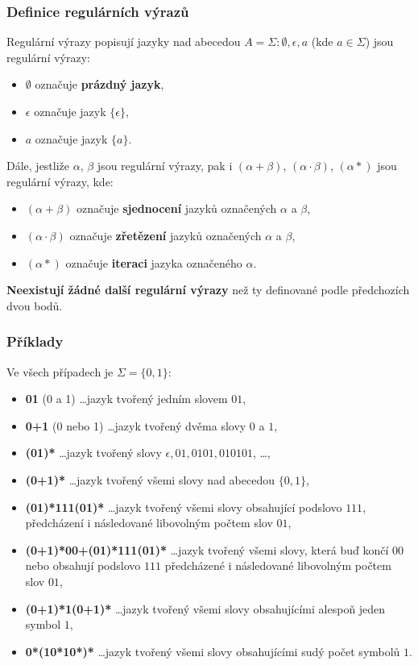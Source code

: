 \subsubsection{Definice regulárních výrazů}
Regulární výrazy popisují jazyky nad abecedou $A = \Sigma: \emptyset, \epsilon, a$ (kde $a \in \Sigma$) jsou regulární výrazy:
\begin{itemize}
	\item $\emptyset$ označuje \textbf{prázdný jazyk},
	\item $\epsilon$ označuje jazyk $\{\epsilon\}$,
	\item $a$ označuje jazyk $\{a\}$.
\end{itemize}
Dále, jestliže $\alpha$, $\beta$ jsou regulární výrazy, pak i $(\alpha + \beta)$, $(\alpha \cdot \beta)$, $(\alpha*)$ jsou regulární výrazy, kde:
\begin{itemize}
	\item $(\alpha + \beta)$ označuje \textbf{sjednocení} jazyků označených $\alpha$ a $\beta$,
	\item $(\alpha \cdot \beta)$ označuje \textbf{zřetězení} jazyků označených $\alpha$ a $\beta$,
	\item $(\alpha*)$ označuje \textbf{iteraci} jazyka označeného $\alpha$.
\end{itemize}
\textbf{Neexistují žádné další regulární výrazy} než ty definované podle předchozích dvou bodů.

\subsubsection*{Příklady}
Ve  všech případech je $\Sigma = \{0, 1\}$:
\begin{itemize}
	\item \textbf{01} (0 a 1) \ldots jazyk tvořený jedním slovem $01$,
	\item \textbf{0+1}  (0 nebo 1) \ldots jazyk tvořený dvěma slovy $0$ a $1$,
	\item \textbf{(01)*}  \ldots jazyk tvořený slovy $\epsilon, 01, 0101, 010101$, \ldots,
	\item \textbf{(0+1)*}  \ldots jazyk tvořený všemi slovy nad abecedou $\{0, 1\}$,
	\item \textbf{(01)*111(01)*}  \ldots jazyk tvořený všemi slovy obsahující podslovo $111$, předcházení i následované libovolným počtem  slov $01$,
	\item \textbf{(0+1)*00+(01)*111(01)*} \ldots jazyk tvořený všemi slovy, která buď končí $00$ nebo obsahují podslovo $111$ předcházené i následované libovolným počtem slov $01$,
	\item \textbf{(0+1)*1(0+1)*} \ldots jazyk tvořený všemi slovy obsahujícími alespoň jeden symbol $1$,
	\item \textbf{0*(10*10*)*} \ldots jazyk tvořený všemi slovy obsahujícími sudý počet symbolů $1$.
\end{itemize}

